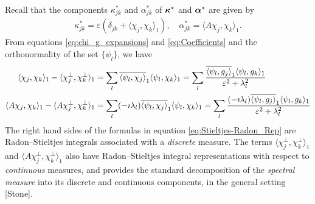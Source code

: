 \documentclass{article}
\newcommand\bkappa{\mbox{\boldmath${\kappa}$}}
\newcommand\balpha{\mbox{\boldmath${\alpha}$}}
\newcommand{\0}{\mathbf{0}}
\newcommand{\1}{\mathbf{1}}
\newcommand{\2}{\mathbf{2}}
\newcommand{\3}{\mathbf{3}}
\newcommand{\4}{\mathbf{4}}
\newcommand{\5}{\mathbf{5}}
\newcommand{\6}{\mathbf{6}}
\newcommand{\7}{\mathbf{7}}
\newcommand{\8}{\mathbf{8}}
\begin{document}
Recall that the components $\kappa^*_{jk}$ and $\alpha^*_{jk}$ of $\bkappa^*$
and $\balpha^*$ are given by 
%
\begin{align}
  \kappa^*_{jk}=\varepsilon(\delta_{jk}+\langle\chi_j,\chi_k\rangle_1), \quad
  \alpha^*_{jk}=\langle A\chi_j,\chi_k\rangle_1.
\end{align}
%
From equations \eqref{eq:chi_g_expansions} and \eqref{eq:Coefficients}
and the orthonormality of the set $\{\psi_l\}$, we have
%
\begin{align}\label{eq:Stieltjes-Radon_Rep}
  \langle\chi_j,\chi_k\rangle_1-\langle\chi_j^\perp,\chi_k^\perp\rangle_1&=\sum_l\overline{\langle\psi_l,\chi_j\rangle}_1\langle\psi_l,\chi_k\rangle_1
         =\sum_l\frac{\overline{\langle\psi_l,g_j\rangle}_1\langle\psi_l,g_k\rangle_1}{\varepsilon^2+\lambda_l^2}
         \notag\\
  \langle A\chi_j,\chi_k\rangle_1-\langle A\chi_j^\perp,\chi_k^\perp\rangle_1&=\sum_l(-\imath\lambda_l)\overline{\langle\psi_l,\chi_j\rangle}_1\langle\psi_l,\chi_k\rangle_1
         =\sum_l\frac{(-\imath\lambda_l)\overline{\langle\psi_l,g_j\rangle}_1\langle\psi_l,g_k\rangle_1}{\varepsilon^2+\lambda_l^2}      
\end{align}
%
The right hand sides of the formulas in equation
\eqref{eq:Stieltjes-Radon_Rep} are Radon--Stieltjes integrals
associated with a \emph{discrete} measure. The terms $\langle\chi_j^\perp,\chi_k^\perp\rangle_1$ and
$\langle A\chi_j^\perp,\chi_k^\perp\rangle_1$ also have Radon--Stieltjes integral representations
with respect to \emph{continuous} measures, and provides the standard
decomposition of the \emph{spectral measure} into its discrete and
continuous components, in the general setting [Stone].
\end{document}
